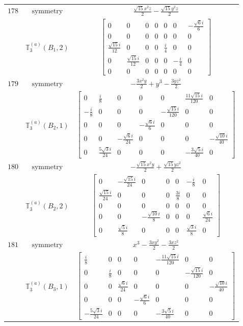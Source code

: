 \documentclass[fleqn,8pt,landscape]{jsarticle}
\begin{document}
\begin{longtable}{ccc}
$ 178 $ & $ \text{symmetry} $ & $ \frac{\sqrt{15} x^{2} z}{2} - \frac{\sqrt{15} y^{2} z}{2} $ \\
$  $ & $ \mathbb{T}_{3}^{(a)}(B_{1},2) $ & $ \begin{bmatrix} 0 & 0 & 0 & 0 & 0 & 0 & - \frac{\sqrt{6} i}{6} \\ 0 & 0 & 0 & 0 & 0 & 0 & 0 \\ \frac{\sqrt{15} i}{12} & 0 & 0 & 0 & \frac{i}{4} & 0 & 0 \\ 0 & \frac{\sqrt{15} i}{12} & 0 & 0 & 0 & - \frac{i}{4} & 0 \\ 0 & 0 & 0 & 0 & 0 & 0 & 0 \end{bmatrix} $ \\ \hline
$ 179 $ & $ \text{symmetry} $ & $ - \frac{3 x^{2} y}{2} + y^{3} - \frac{3 y z^{2}}{2} $ \\
$  $ & $ \mathbb{T}_{3}^{(a)}(B_{2},1) $ & $ \begin{bmatrix} 0 & \frac{i}{8} & 0 & 0 & 0 & \frac{11 \sqrt{15} i}{120} & 0 \\ - \frac{i}{8} & 0 & 0 & 0 & - \frac{\sqrt{15} i}{120} & 0 & 0 \\ 0 & 0 & 0 & - \frac{\sqrt{6} i}{6} & 0 & 0 & 0 \\ 0 & 0 & - \frac{\sqrt{6} i}{24} & 0 & 0 & 0 & - \frac{\sqrt{10} i}{40} \\ 0 & \frac{5 \sqrt{3} i}{24} & 0 & 0 & 0 & - \frac{3 \sqrt{5} i}{40} & 0 \end{bmatrix} $ \\ \hline
$ 180 $ & $ \text{symmetry} $ & $ - \frac{\sqrt{15} x^{2} y}{2} + \frac{\sqrt{15} y z^{2}}{2} $ \\
$  $ & $ \mathbb{T}_{3}^{(a)}(B_{2},2) $ & $ \begin{bmatrix} 0 & - \frac{\sqrt{15} i}{24} & 0 & 0 & 0 & - \frac{i}{8} & 0 \\ \frac{\sqrt{15} i}{24} & 0 & 0 & 0 & \frac{3 i}{8} & 0 & 0 \\ 0 & 0 & 0 & 0 & 0 & 0 & 0 \\ 0 & 0 & - \frac{\sqrt{10} i}{8} & 0 & 0 & 0 & \frac{\sqrt{6} i}{24} \\ 0 & \frac{\sqrt{5} i}{8} & 0 & 0 & 0 & \frac{\sqrt{3} i}{8} & 0 \end{bmatrix} $ \\ \hline
$ 181 $ & $ \text{symmetry} $ & $ x^{3} - \frac{3 x y^{2}}{2} - \frac{3 x z^{2}}{2} $ \\
$  $ & $ \mathbb{T}_{3}^{(a)}(B_{3},1) $ & $ \begin{bmatrix} \frac{i}{8} & 0 & 0 & 0 & - \frac{11 \sqrt{15} i}{120} & 0 & 0 \\ 0 & \frac{i}{8} & 0 & 0 & 0 & - \frac{\sqrt{15} i}{120} & 0 \\ 0 & 0 & \frac{\sqrt{6} i}{24} & 0 & 0 & 0 & - \frac{\sqrt{10} i}{40} \\ 0 & 0 & 0 & - \frac{\sqrt{6} i}{6} & 0 & 0 & 0 \\ - \frac{5 \sqrt{3} i}{24} & 0 & 0 & 0 & - \frac{3 \sqrt{5} i}{40} & 0 & 0 \end{bmatrix} $ \\ \hline

\end{longtable}
\end{document}
